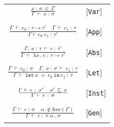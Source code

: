 
\begin{table}[h!]
  \begin{center}
    \begin{tabular}{cl} 
      \\
      \(\frac
         {x \ : \ \sigma \ \in \ \Gamma}
        {\Gamma \  \vdash \ x \ : \ \sigma} \) 
      &  [\texttt{Var}]  \\
      \\
      
      \\
      \(\frac
        {\Gamma \  \vdash \ {e}_{0} \ : \ \tau \rightarrow {\tau}' \;\;\;\; \Gamma \  \vdash \  {e}_{1} \ : \ \tau}
        {\Gamma \vdash {e}_{0} \; {e}_{1} \ : \ {\tau}'} \)
      & [\texttt{App}] \\
      \\
      
      \\
      \(\frac
        {\Gamma , \ x \ : \ \tau \ \vdash \ e \ : \ {\tau}'}
        {\Gamma \ \vdash \ \lambda x \ . \ e \ : \ \tau \rightarrow{\tau}'}\)
      & [\texttt{Abs}] \\
      \\
      
      \\
      \(\frac
        {\Gamma \ \vdash \ {e}_{0} \ : \ \sigma \;\;\;\; 
         \Gamma, \ x \ : \ \sigma \ \vdash \ {e}_{1} \ : \ \tau}
        {\Gamma \ \vdash \ \texttt{let} \ x \ = \ {e}_{0} \ \texttt{in} \ {e}_{1} \ : \ \tau}\)
      & [\texttt{Let}] \\ 
      \\
      
      \\
      \(\frac
        {
            \newline
            \Gamma \ \vdash \ e \ : \ {\sigma}' \;\;\;\;
            {\sigma}' \ \sqsubseteq  \ \sigma
        }
        {
            \Gamma \ \vdash \ e \ : \ \sigma
        }\)
      & [\texttt{Inst}] \\
      \\
      
      \\
      \(
       \frac
       {
        \Gamma \ \vdash \ e \ : \ \sigma \;\;\;\;
        \alpha \ \notin \text{free}(\Gamma)
       }
       {
        \Gamma \ \vdash \ e \ : \ \forall \ \alpha \ . \ \sigma
       }
      \)
      & [\texttt{Gen}] \\
      \\
    \end{tabular}
  \end{center}
\end{table}

